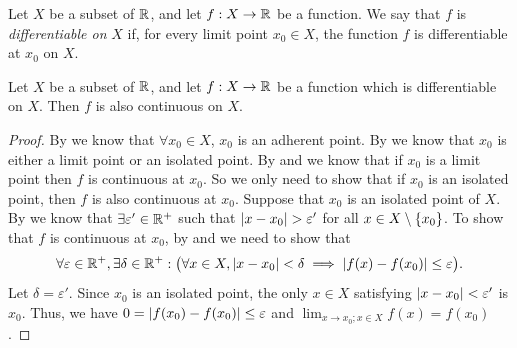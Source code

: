 \begin{defn}\label{i:10.1.11}
  Let \(X\) be a subset of \(\mathbb{R}\), and let \(f : X \to \mathbb{R}\) be a function.
  We say that \(f\) is \emph{differentiable on} \(X\) if, for every limit point \(x_0 \in X\), the function \(f\) is differentiable at \(x_0\) on \(X\).
\end{defn}

\begin{cor}\label{i:10.1.12}
  Let \(X\) be a subset of \(\mathbb{R}\), and let \(f : X \to \mathbb{R}\) be a function which is differentiable on \(X\).
  Then \(f\) is also continuous on \(X\).
\end{cor}

\begin{proof}
  By  we know that \(\forall x_0 \in X\), \(x_0\) is an adherent point.
  By  we know that \(x_0\) is either a limit point or an isolated point.
  By  and  we know that if \(x_0\) is a limit point then \(f\) is continuous at \(x_0\).
  So we only need to show that if \(x_0\) is an isolated point, then \(f\) is also continuous at \(x_0\).
  Suppose that \(x_0\) is an isolated point of \(X\).
  By  we know that \(\exists \varepsilon' \in \mathbb{R}^+\) such that \(\left\lvert x - x_0\right\rvert > \varepsilon'\) for all \(x \in X \setminus \left\lbrace x_0\right\rbrace\).
  To show that \(f\) is continuous at \(x_0\), by  and  we need to show that
  \[
    \forall \varepsilon \in \mathbb{R}^+, \exists \delta \in \mathbb{R}^+ : \big(\forall x \in X, \left\lvert x - x_0\right\rvert < \delta \implies \left\lvert f(x) - f(x_0)\right\rvert \leq \varepsilon\big).
  \]
  Let \(\delta = \varepsilon'\).
  Since \(x_0\) is an isolated point, the only \(x \in X\) satisfying \(\left\lvert x - x_0\right\rvert < \varepsilon'\) is \(x_0\).
  Thus, we have \(0 = \left\lvert f(x_0) - f(x_0)\right\rvert \leq \varepsilon\) and \(\lim_{x \to x_0 ; x \in X} f(x) = f(x_0)\).
\end{proof}


